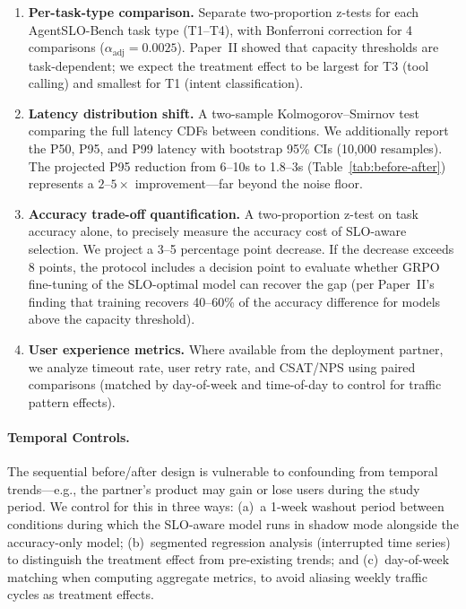 \documentclass[11pt]{article}
\begin{document}
\begin{enumerate}[leftmargin=16pt]
    \item \textbf{Per-task-type comparison.} Separate two-proportion z-tests for each AgentSLO-Bench task type (T1--T4), with Bonferroni correction for 4 comparisons ($\alpha_{\text{adj}} = 0.0025$). Paper~II showed that capacity thresholds are task-dependent; we expect the treatment effect to be largest for T3 (tool calling) and smallest for T1 (intent classification).

    \item \textbf{Latency distribution shift.} A two-sample Kolmogorov--Smirnov test comparing the full latency CDFs between conditions. We additionally report the P50, P95, and P99 latency with bootstrap 95\% CIs (10,000 resamples). The projected P95 reduction from 6--10s to 1.8--3s (Table~\ref{tab:before-after}) represents a $2$--$5\times$ improvement---far beyond the noise floor.

    \item \textbf{Accuracy trade-off quantification.} A two-proportion z-test on task accuracy alone, to precisely measure the accuracy cost of SLO-aware selection. We project a 3--5 percentage point decrease. If the decrease exceeds 8 points, the protocol includes a decision point to evaluate whether GRPO fine-tuning of the SLO-optimal model can recover the gap (per Paper~II's finding that training recovers 40--60\% of the accuracy difference for models above the capacity threshold).

    \item \textbf{User experience metrics.} Where available from the deployment partner, we analyze timeout rate, user retry rate, and CSAT/NPS using paired comparisons (matched by day-of-week and time-of-day to control for traffic pattern effects).
\end{enumerate}

\paragraph{Temporal Controls.} The sequential before/after design is vulnerable to confounding from temporal trends---e.g., the partner's product may gain or lose users during the study period. We control for this in three ways: (a)~a 1-week washout period between conditions during which the SLO-aware model runs in shadow mode alongside the accuracy-only model; (b)~segmented regression analysis (interrupted time series) to distinguish the treatment effect from pre-existing trends; and (c)~day-of-week matching when computing aggregate metrics, to avoid aliasing weekly traffic cycles as treatment effects.
\end{document}
